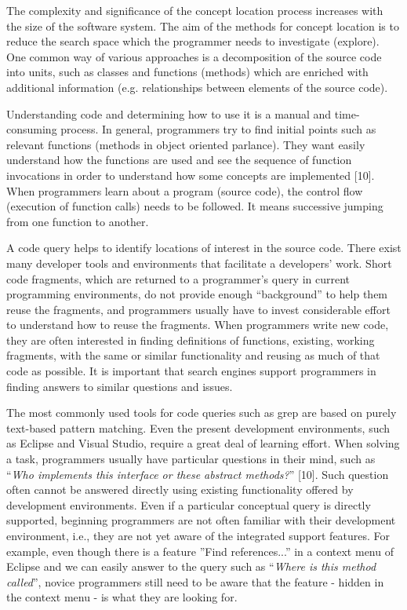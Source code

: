 \documentclass{llncs}
\begin{document}
The complexity and significance of the concept location process increases with the
size of the software system. The aim of the methods for concept location is to reduce
the search space which the programmer needs to investigate (explore). One common
way of various approaches is a decomposition of the source code into units, such as
classes and functions (methods) which are enriched with additional information (e.g.
relationships between elements of the source code).

Understanding code and determining how to use it is a manual and time-consuming
process. In general, programmers try to find initial points such as relevant functions
(methods in object oriented parlance). They want easily understand how the functions
are used and see the sequence of function invocations in order to understand how
some concepts are implemented [10]. When programmers learn about a program
(source code), the control flow (execution of function calls) needs to be followed. It
means successive jumping from one function to another.

A code query helps to identify locations of interest in the source code. There exist
many developer tools and environments that facilitate a developers’ work. Short code
fragments, which are returned to a programmer’s query in current programming environments,
do not provide enough “background” to help them reuse the fragments, and
programmers usually have to invest considerable effort to understand how to reuse the
fragments. When programmers write new code, they are often interested in finding
definitions of functions, existing, working fragments, with the same or similar functionality
and reusing as much of that code as possible. It is important that search engines
support programmers in finding answers to similar questions and issues.

The most commonly used tools for code queries such as grep are based on purely
text-based pattern matching. Even the present development environments, such as
Eclipse and Visual Studio, require a great deal of learning effort. When solving a task,
programmers usually have particular questions in their mind, such as “\textit{Who implements
this interface or these abstract methods?}” [10]. Such question often cannot be
answered directly using existing functionality offered by development environments.
Even if a particular conceptual query is directly supported, beginning programmers
are not often familiar with their development environment, i.e., they are not yet aware
of the integrated support features. For example, even though there is a feature ”Find
references...” in a context menu of Eclipse and we can easily answer to the query such
as “\textit{Where is this method called}”, novice programmers still need to be aware that the
feature - hidden in the context menu - is what they are looking for.
\end{document}
